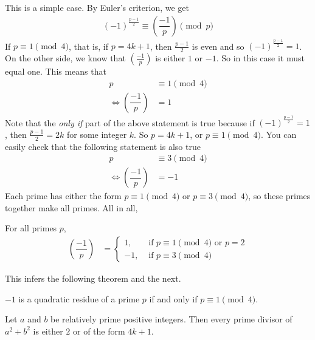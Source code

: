 \documentclass[main.tex]{subfile}
\begin{document}
	\begin{solution}
		This is a simple case. By Euler's criterion, we get
		\begin{align*}
			(-1)^{\frac{p-1}{2}} \equiv \left(\dfrac{-1}{p}\right) \pmod p
		\end{align*}
		If $p \equiv 1 \pmod 4$, that is, if $p=4k+1$, then $\frac{p-1}{2}$ is even and so $(-1)^{\frac{p-1}{2}} =1$. On the other side, we know that $\left(\frac{-1}{p}\right)$ is either $1$ or $-1$. So in this case it must equal one. This means that
		\begin{align*}
			p
				& \equiv 1 \pmod 4\\
			\iff \left(\dfrac{-1}{p}\right)
				& =1
		\end{align*}
		Note that the \textit{only if} part of the above statement is true because if $(-1)^{\frac{p-1}{2}}=1$, then $\frac{p-1}{2} = 2k$ for some integer $k$. So $p=4k+1$, or $p \equiv 1 \pmod 4$. You can easily check that the following statement is also true
		\begin{align*}
			p
				& \equiv 3 \pmod 4\\
			\iff \left(\dfrac{-1}{p}\right)
				& =-1
		\end{align*}
		Each prime has either the form $p \equiv 1 \pmod 4$ or $p \equiv 3 \pmod 4$, so these primes together make all primes. All in all,
	\end{solution}

	\begin{theorem}\label{thm:-1qr} For all primes $p$,
		\begin{align*}
		\left(\dfrac{-1}{p}\right)
		& =
		\begin{cases}
		1,&\mbox{ if } p \equiv 1 \pmod 4\text{ or }p=2\\
		-1, &\mbox{ if } p \equiv 3 \pmod 4
		\end{cases}
		\end{align*}
	\end{theorem}
This infers the following theorem and the next.
	\begin{theorem}
		$-1$ is a quadratic residue of a prime $p$ if and only if $p\equiv1\pmod4$.
	\end{theorem}

	\begin{theorem} \label{thm:a^2+b^2}
		Let $a$ and $b$ be relatively prime positive integers. Then every prime divisor of $a^2+b^2$ is either $2$ or of the form $4k+1$.
	\end{theorem}
\end{document}
